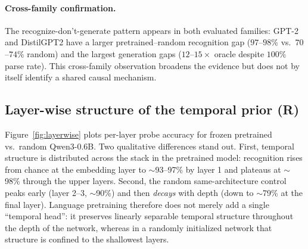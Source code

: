\documentclass{article}
\begin{document}
\begin{table}[t]
\centering
\small
{}
\caption{R5 family $\times$ scale: recognition and generation (3 seeds,
mean$\pm$std).  Feature floor is $0.99$ for all.  GPT-2/DistilGPT2 parse $100\%$
of outputs yet are $12$--$15\times$ worse than the oracle expert---the largest
generation gaps of any family---confirming that generation failure is a
continuation/regression failure, not a formatting one.}
\label{tab:scale}
\end{table}

\paragraph{Cross-family confirmation.}  The recognize-don't-generate pattern
appears in both evaluated families: GPT-2 and DistilGPT2 have a larger
pretrained--random recognition gap ($97$--$98\%$ vs.\ $70$--$74\%$ random) and
the largest generation gaps ($12$--$15\times$ oracle despite $100\%$ parse
rate).  This cross-family observation broadens the evidence but does not by
itself identify a shared causal mechanism.

\subsection{Layer-wise structure of the temporal prior (R)}
\label{sec:layerwise}
Figure~\ref{fig:layerwise} plots per-layer probe accuracy for frozen
pretrained vs.\ random Qwen3-0.6B.  Two qualitative differences stand out.
First, temporal structure is distributed across the stack in the pretrained
model: recognition rises from chance at the embedding layer to $\sim$93--97\%
by layer 1 and plateaus at $\sim$98\% through the upper layers.  Second, the
random same-architecture control peaks early (layer 2--3, $\sim$90\%) and then
\emph{decays} with depth (down to $\sim$79\% at the final layer).  Language
pretraining therefore does not merely add a single ``temporal head'': it
preserves linearly separable temporal structure throughout the depth of the
network, whereas in a randomly initialized network that structure is confined
to the shallowest layers.
\end{document}
